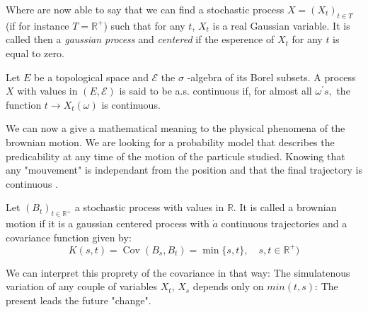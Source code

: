 Where are now able to say that we can find a stochastic process $X=\left(X_{t}\right)_{t \in T}$ (if for instance $T=\mathbb{R^+}$) such that for any $t$, $X_{t}$ is a real Gaussian variable. It is called then a \textit{gaussian process} and \textit{centered} if the esperence of $X_t$ for any $t$ is equal to zero.
\begin{definition}
	Let $E$ be a topological space and $\mathscr{E}$ the $\sigma$ -algebra of its Borel subsets. A process $X$ with values in $(E, \mathscr{E})$ is said to be a.s. continuous if, for almost all $\omega^{\prime} s,$ the function $t \rightarrow X_{t}(\omega)$ is continuous.
\end{definition}

We can now a give a mathematical meaning to the physical phenomena of the brownian motion. We are looking for a probability model that describes the predicability at any time of the motion of the particule studied. Knowing that any "mouvement" is independant from the position and that the final trajectory is continuous .

\begin{definition}
	Let $(B_t)_{t \in\mathbb{R^+}}$ a stochastic process with values in $\mathbb{R}$. It is called a brownian motion if it is a gaussian centered process with $\dot{a}$ continuous trajectories and a covariance function given by:
	\[
	K(s, t)=\operatorname{Cov}\left(B_{s}, B_{t}\right)=\min \{s, t\}, \quad s, t \in\mathbb{R^+})
	\]
\end{definition}

We can interpret this proprety of the covariance in that way: The simulatenous variation of any couple of variables $X_t$, $X_s$ depends only on $min(t,s)$: The present leads the future "change".


